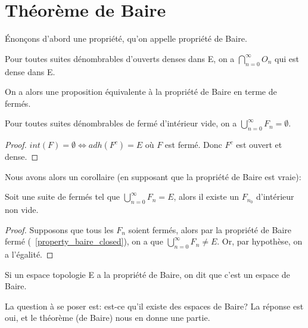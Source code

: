 \chapter{Théorème de Baire}

Énonçons d'abord une propriété, qu'on appelle propriété de Baire.

\begin{propriete} 
\label{property_baire_open}
	Pour toutes suites dénombrables d'ouverts denses dans E, on a $\displaystyle
	\bigcap_{n = 0}^{\infty} O_{n}$ qui est dense dans E.
\end{propriete}

On a alors une proposition équivalente à la propriété de Baire en terme de
fermés.

\begin{propriete} 
\label{property_baire_closed}
	Pour toutes suites dénombrables de fermé d'intérieur vide, on a
	$\displaystyle \bigcup_{n = 0}^{\infty} F_{n} = \emptyset$.
\end{propriete}

\begin{proof}
	$int(F) = \emptyset \Leftrightarrow adh(F^{c}) = E$ où $F$ est fermé. Donc
	$F^{c}$ est ouvert et dense.
\end{proof}

Nous avons alors un corollaire (en supposant que la propriété de Baire est
vraie):

\begin{corollary}
\label{corollary_baire_int_non_empty}
	Soit une suite  de fermés tel que $\displaystyle
	\bigcup_{n = 0}^{\infty}{F_{n}} = E$, alors il existe un $F_{n_{0}}$
	d'intérieur non vide.
\end{corollary}

\begin{proof}
	Supposons que tous les $F_{n}$ soient fermés, alors par la
	propriété de Baire fermé (~\ref{property_baire_closed}), on a que
	$\displaystyle \bigcup_{n = 0}^{\infty}{F_{n}} \neq E$. Or, par hypothèse,
	on a l'égalité.
\end{proof}

\begin{definition} 
\label{definition_baire_space}
	Si un espace topologie E a la propriété de Baire, on dit que c'est un espace
	de Baire.
\end{definition}

La question à se poser est: est-ce qu'il existe des espaces de Baire? La
réponse est oui, et le théorème (de Baire) nous en donne une partie.

